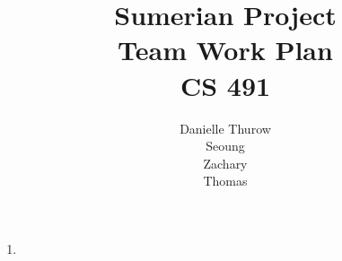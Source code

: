 \documentclass[11pt]{article}
\title{Sumerian Project\\
		Team Work Plan\\
		CS 491}
\author{Danielle Thurow \\
		  Seoung\\
		  Zachary\\
		  Thomas}
\date{}
\begin{document}
\maketitle

\begin{enumerate}
\item   



\end{enumerate}
\end{document}
